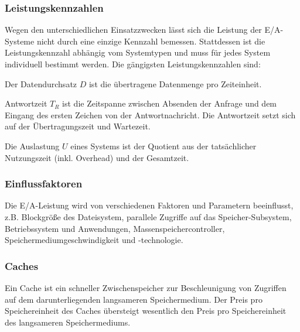 \subsubsection{Leistungskennzahlen}
Wegen den unterschiedlichen Einsatzzwecken lässt sich die Leistung der E/A-Systeme nicht durch eine einzige Kennzahl bemessen. 
Stattdessen ist die Leistungskennzahl abhängig vom Systemtypen und muss für jedes System individuell bestimmt werden. 
Die gängigsten Leistungskennzahlen sind:

\begin{term}[Datendurchsatz] %
	Der Datendurchsatz $D$ ist die übertragene Datenmenge pro Zeiteinheit.
\end{term}

\begin{term}[Antwortzeit]
	Antwortzeit $T_R$ ist die Zeitspanne zwischen Absenden der Anfrage und dem Eingang des ersten Zeichen von der Antwortnachricht. Die Antwortzeit setzt sich auf der Übertragungszeit und Wartezeit.
\end{term}

\begin{term}[Auslastung]
	Die Auslastung $U$ eines Systems ist der Quotient aus der tatsächlicher Nutzungszeit (inkl. Overhead) und der Gesamtzeit. 
\end{term}


\subsubsection{Einflussfaktoren}
Die E/A-Leistung wird von verschiedenen Faktoren und Parametern beeinflusst, z.B. Blockgröße des Dateisystem, parallele Zugriffe auf das Speicher-Subsystem, Betriebssystem und Anwendungen, Massenspeichercontroller, Speichermediumgeschwindigkeit und -technologie.




\subsubsection{Caches}
Ein Cache ist ein schneller Zwischenspeicher zur Beschleunigung von Zugriffen auf dem darunterliegenden langsameren Speichermedium. 
Der Preis pro Speichereinheit des Caches übersteigt wesentlich den Preis pro Speichereinheit des langsameren Speichermediums.

